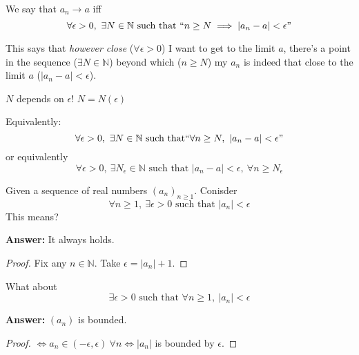 
\begin{definition}
We say that $a_n \to a$ iff 
\[\forall \epsilon >0,~\exists N \in \mathbb{N} \text{ such that } ``n \geq N \implies |a_n - a| < \epsilon"\]	
\end{definition}

This says that \emph{however close} ($\forall \epsilon>0$) I want to get to the limit $a$, there's a point in the sequence ($\exists N \in \mathbb{N}$) beyond which ($n \geq N$) my $a_n$ is indeed that close to the limit $a$ ($|a_n - a| <\epsilon$).\\ 

\begin{remark}
$N$ depends on $\epsilon$! $N = N(\epsilon)$	
\end{remark}

Equivalently:
\[\forall \epsilon >0,~ \exists N \in \mathbb{N} \text{ such that} ``\forall n \geq N,~|a_n -a|<\epsilon"\]
or equivalently
\[\forall \epsilon >0,~\exists N_\epsilon\in\mathbb{N} \text{ such that } |a_n - a| < \epsilon,~\forall n \geq N_\epsilon\]

\begin{clicker}Given a sequence of real numbers $(a_n)_{n\geq 1}$. Conisder 
\[\boxed{\forall n \geq 1,~\exists \epsilon >0 \text{ such that } |a_n|< \epsilon}\]
This means? 

\textbf{Answer:} It always holds. \begin{proof}
 Fix any $n \in \mathbb{N}$. Take $\epsilon = |a_n| + 1$. 	
 \end{proof}
 
What about
 \[\boxed{\exists \epsilon >0 \text{ such that } \forall n \geq 1,~|a_n| < \epsilon} \]
 
 \textbf{Answer:} $(a_n)$ is bounded.
 
 
\begin{center}
\end{center}


  \begin{proof}
$\iff a_n \in (-\epsilon,\epsilon)~ \forall n \iff |a_n|$ is bounded by $\epsilon$. \end{proof}

\end{clicker}~

